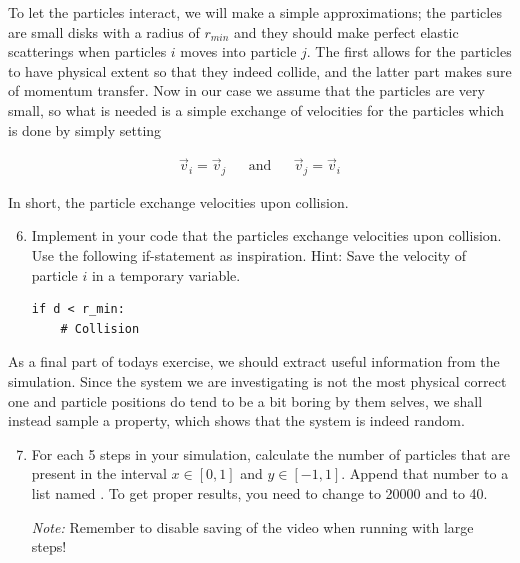 \documentclass{article}
\begin{document}
To let the particles interact, we will make a simple approximations; the
particles are small disks with a radius of $r_{min}$ and they should make
perfect elastic scatterings when particles $i$ moves into particle $j$.  The
first allows for the particles to have physical extent so that they indeed
collide, and the latter part makes sure of momentum transfer.  Now in our case
we assume that the particles are very small, so what is needed is a simple
exchange of velocities for the particles which is done by simply setting

\begin{align}
  \vec{v}_i = \vec{v}_j & & \text{and} & & \vec{v}_j = \vec{v}_i
\end{align}

In short, the particle exchange velocities upon collision.

\begin{enumerate}
  \setcounter{enumi}{5}
  \item Implement in your code that the particles exchange velocities upon
    collision. Use the following if-statement as inspiration.
    {Hint:} Save the velocity of particle $i$ in a temporary variable.

\begin{lstlisting}
if d < r_min:
    # Collision
\end{lstlisting}

\end{enumerate}

As a final part of todays exercise, we should extract useful information from
the simulation.
Since the system we are investigating is not the most physical correct one and
particle positions do tend to be a bit boring by them selves, we shall instead
sample a property, which shows that the system is indeed random.

\begin{enumerate}
  \setcounter{enumi}{6}
  \item For each 5 steps in your simulation, calculate the number of particles
    that are present in the interval $x \in [0, 1]$ and $y \in [-1, 1]$.
    Append that number to a list named .  To get proper results,
    you need to change  to 20000 and  to 40.

    {\em Note:} Remember to disable saving of the video when running with large
    steps!

\end{enumerate}
\end{document}
